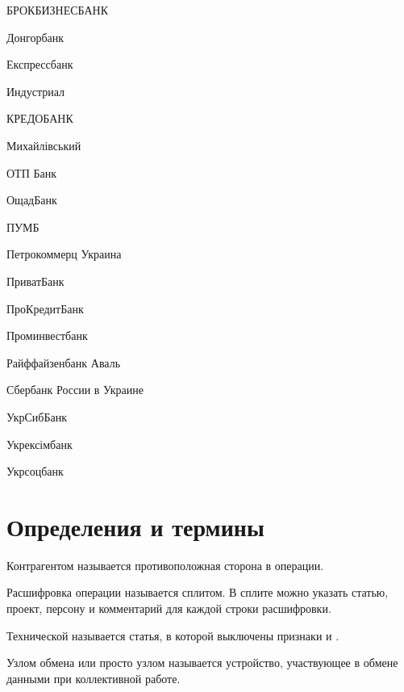 \documentclass[a4paper,10pt,russian]{sphinxmanual}
\begin{document}
\sphinxAtStartPar
БРОКБИЗНЕСБАНК

\sphinxAtStartPar
Донгорбанк

\sphinxAtStartPar
Експресс\sphinxhyphen{}банк

\sphinxAtStartPar
Индустриал

\sphinxAtStartPar
КРЕДОБАНК

\sphinxAtStartPar
Михайлівський

\sphinxAtStartPar
ОТП Банк

\sphinxAtStartPar
ОщадБанк

\sphinxAtStartPar
ПУМБ

\sphinxAtStartPar
Петрокоммерц Украина

\sphinxAtStartPar
ПриватБанк

\sphinxAtStartPar
ПроКредитБанк

\sphinxAtStartPar
Проминвестбанк

\sphinxAtStartPar
Райффайзенбанк Аваль

\sphinxAtStartPar
Сбербанк России в Украине

\sphinxAtStartPar
УкрСибБанк

\sphinxAtStartPar
Укрексімбанк

\sphinxAtStartPar
Укрсоцбанк

\sphinxstepscope


\chapter{Определения и термины}
\label{\detokenize{glossary:chapter-index}}\label{\detokenize{glossary:id1}}\label{\detokenize{glossary::doc}}\begin{description}
\sphinxAtStartPar
Контрагентом называется противоположная сторона в операции.

\sphinxAtStartPar
Расшифровка операции называется сплитом. В сплите можно указать статью, проект, персону и комментарий
для каждой строки расшифровки.

\sphinxAtStartPar
Технической называется статья, в которой выключены признаки  и .

\sphinxAtStartPar
Узлом обмена или просто узлом называется устройство, участвующее в обмене данными при коллективной работе.

\end{description}
\end{document}
